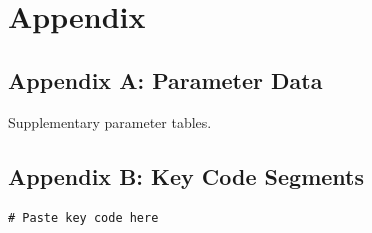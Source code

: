 \documentclass[12pt,letterpaper]{article}
\numberwithin{equation}{section}
\numberwithin{figure}{section}
\numberwithin{table}{section}
\begin{document}
\newpage
\section*{Appendix}

\subsection*{Appendix A: Parameter Data}
\textlangle Supplementary parameter tables.\textrangle

\subsection*{Appendix B: Key Code Segments}
{\small\ttfamily
\begin{verbatim}
# Paste key code here
\end{verbatim}
}
\end{document}
